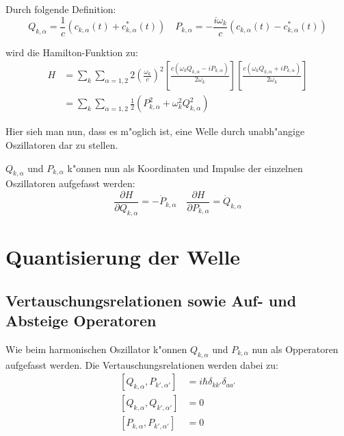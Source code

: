 Durch folgende Definition:
\begin{equation}
Q_{k,\alpha} = \frac{1}{c}(c_{k,\alpha}(t) + c^*_{k,\alpha}(t)) \quad P_{k,\alpha} = -\frac{i\omega_k}{c}(c_{k,\alpha}(t) - c^*_{k,\alpha}(t)) 
\end{equation}

wird die Hamilton-Funktion zu:
\begin{equation} \label{fq:hamilton}
\begin{split}
H &= \sum_k \sum_{\alpha=1,2} 2 \left(\frac{\omega_k}{c}\right)^2 \left[ \frac{c(\omega_k Q_{k,\alpha} - i P_{k,\alpha})}{2 \omega_k} \right] \left[ \frac{c(\omega_k Q_{k,\alpha} + i P_{k,\alpha})}{2 \omega_k} \right] \\
&= \sum_k \sum_{\alpha=1,2} \frac{1}{2} (P_{k,\alpha}^2 + \omega_k^2 Q_{k,\alpha}^2)
\end{split}
\end{equation}

Hier sieh man nun, dass es m"oglich ist, eine Welle durch unabh"angige Oszillatoren dar zu stellen.

$Q_{k,\alpha}$ und $P_{k,\alpha}$ k"onnen nun als Koordinaten und Impulse der einzelnen Oszillatoren aufgefasst werden:
\begin{equation}
\dfrac{\partial H}{\partial Q_{k,\alpha}} = -\dot{P}_{k,\alpha} \quad \dfrac{\partial H}{\partial P_{k,\alpha}} = \dot{Q}_{k,\alpha}
\end{equation}

\section{Quantisierung der Welle}

\subsection{Vertauschungsrelationen sowie Auf- und Absteige Operatoren}
Wie beim harmonischen Oszillator k"onnen $Q_{k,\alpha}$ und $P_{k,\alpha}$ nun als Opperatoren aufgefasst werden. Die Vertauschungsrelationen werden dabei zu:
\begin{equation}
\begin{split}
[Q_{k,\alpha}, P_{k',\alpha'}] &= i \hbar \delta_{kk'}\delta_{aa'} \\
[Q_{k,\alpha}, Q_{k',\alpha'}] &= 0 \\
[P_{k,\alpha}, P_{k',\alpha'}] &= 0
\end{split}
\end{equation}

